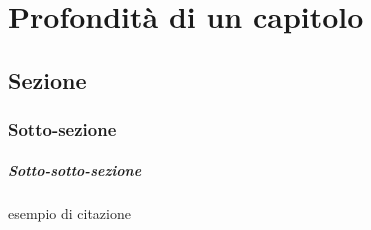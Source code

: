 \chapter{Profondità di un capitolo}
    \section{Sezione}
        \subsection{Sotto-sezione}
            \paragraph{Sotto-sotto-sezione}


esempio di citazione~\cite{latex:companion}